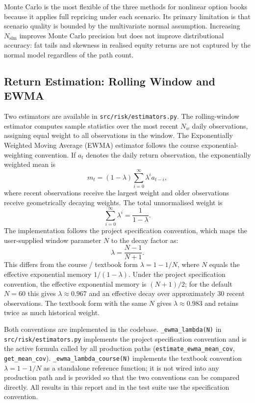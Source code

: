 \documentclass[11pt]{article}
\newcommand{\code}[1]{\texttt{#1}}
\begin{document}
Monte Carlo is the most flexible of the three methods for nonlinear option
books because it applies full repricing under each scenario.  Its primary
limitation is that scenario quality is bounded by the multivariate normal
assumption.  Increasing $N_{\mathrm{sim}}$ improves Monte Carlo precision but
does not improve distributional accuracy: fat tails and skewness in realised
equity returns are not captured by the normal model regardless of the path
count.

\subsection{Return Estimation: Rolling Window and EWMA}

Two estimators are available in \code{src/risk/estimators.py}.  The
rolling-window estimator computes sample statistics over the most recent $N_w$
daily observations, assigning equal weight to all observations in the window.
The Exponentially Weighted Moving Average (EWMA) estimator follows the course
exponential-weighting convention.  If $a_t$ denotes the daily return observation,
the exponentially weighted mean is
\begin{equation}
  m_t = (1-\lambda)\sum_{i=0}^{\infty}\lambda^i a_{t-i},
  \label{eq:ewma_mean}
\end{equation}
where recent observations receive the largest weight and older observations
receive geometrically decaying weights.  The total unnormalised weight is
\begin{equation}
  \sum_{i=0}^{\infty}\lambda^i = \frac{1}{1-\lambda}.
  \label{eq:ewma_total_weight}
\end{equation}
The implementation follows the project specification convention, which maps the
user-supplied window parameter $N$ to the decay factor as:
\begin{equation}
  \lambda = \frac{N-1}{N+1}.
  \label{eq:ewma_lambda_impl}
\end{equation}
This differs from the course / textbook form $\lambda = 1 - 1/N$, where $N$
equals the effective exponential memory $1/(1-\lambda)$.  Under the project
specification convention, the effective exponential memory is $(N+1)/2$; for
the default $N = 60$ this gives $\lambda \approx 0.967$ and an effective decay
over approximately 30 recent observations.  The textbook form with the same $N$
gives $\lambda \approx 0.983$ and retains twice as much historical weight.

Both conventions are implemented in the codebase.
\texttt{\_ewma\_lambda(N)} in \texttt{src/risk/estimators.py} implements the
project specification convention and is the active formula called by all
production paths (\texttt{estimate\_ewma\_mean\_cov}, \texttt{get\_mean\_cov}).
\texttt{\_ewma\_lambda\_course(N)} implements the textbook convention
$\lambda = 1 - 1/N$ as a standalone reference function; it is not wired into
any production path and is provided so that the two conventions can be compared
directly.  All results in this report and in the test suite use the
specification convention.
\end{document}

